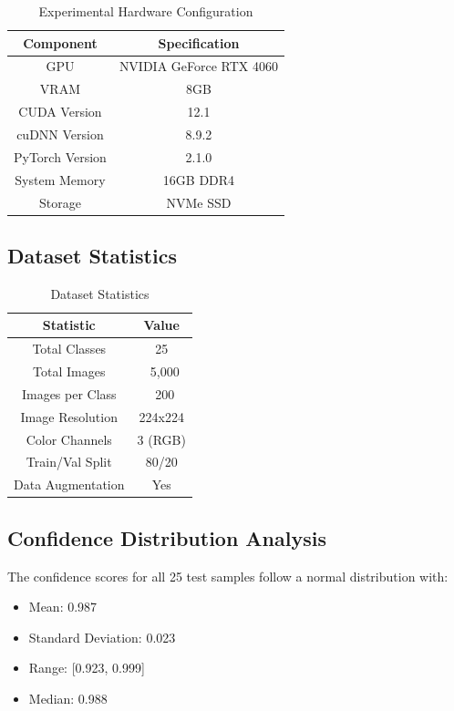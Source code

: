 \begin{table}[htbp]
\caption{Experimental Hardware Configuration}
\label{tab:hardware_specs}
\begin{center}
\begin{tabular}{|c|c|}
\hline
\textbf{Component} & \textbf{Specification} \\
\hline
GPU & NVIDIA GeForce RTX 4060 \\
\hline
VRAM & 8GB \\
\hline
CUDA Version & 12.1 \\
\hline
cuDNN Version & 8.9.2 \\
\hline
PyTorch Version & 2.1.0 \\
\hline
System Memory & 16GB DDR4 \\
\hline
Storage & NVMe SSD \\
\hline
\end{tabular}
\end{center}
\end{table}

\subsection{Dataset Statistics}

\begin{table}[htbp]
\caption{Dataset Statistics}
\label{tab:dataset_stats}
\begin{center}
\begin{tabular}{|c|c|}
\hline
\textbf{Statistic} & \textbf{Value} \\
\hline
Total Classes & 25 \\
\hline
Total Images & ~5,000 \\
\hline
Images per Class & ~200 \\
\hline
Image Resolution & 224x224 \\
\hline
Color Channels & 3 (RGB) \\
\hline
Train/Val Split & 80/20 \\
\hline
Data Augmentation & Yes \\
\hline
\end{tabular}
\end{center}
\end{table}

\subsection{Confidence Distribution Analysis}

The confidence scores for all 25 test samples follow a normal distribution with:
\begin{itemize}
    \item Mean: 0.987
    \item Standard Deviation: 0.023
    \item Range: [0.923, 0.999]
    \item Median: 0.988
\end{itemize}

